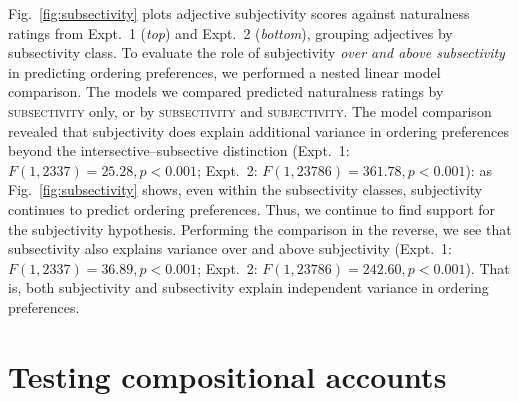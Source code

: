 \documentclass[12pt]{article}
\newcommand{\jd}[1]{\textcolor{red}{[jd: #1]}}
\begin{document}
Fig.~\ref{fig:subsectivity} plots adjective subjectivity scores against naturalness ratings from Expt.~1 (\emph{top}) and Expt.~2 (\emph{bottom}), grouping adjectives by subsectivity class. To evaluate the role of subjectivity \emph{over and above subsectivity} in predicting ordering preferences, we performed a nested linear model comparison. The models  %
we compared predicted naturalness ratings by \textsc{subsectivity} only, or by \textsc{subsectivity} and \textsc{subjectivity}. The model comparison revealed that subjectivity does explain additional variance in ordering preferences beyond the intersective--subsective distinction (Expt.~1: $F(1,2337)=25.28, p<0.001$; Expt.~2: $F(1,23786)=361.78, p<0.001$): as Fig.~\ref{fig:subsectivity} shows, even within the subsectivity classes, subjectivity continues to predict ordering preferences. Thus, we continue to find support for the subjectivity hypothesis.  Performing the comparison in the reverse, we see that subsectivity also explains variance over and above subjectivity (Expt.~1: $F(1,2337)=36.89, p<0.001$; Expt.~2: $F(1,23786)=242.60, p<0.001$). That is, both subjectivity and subsectivity explain independent variance in ordering preferences.


\section{Testing compositional accounts}
\end{document}
